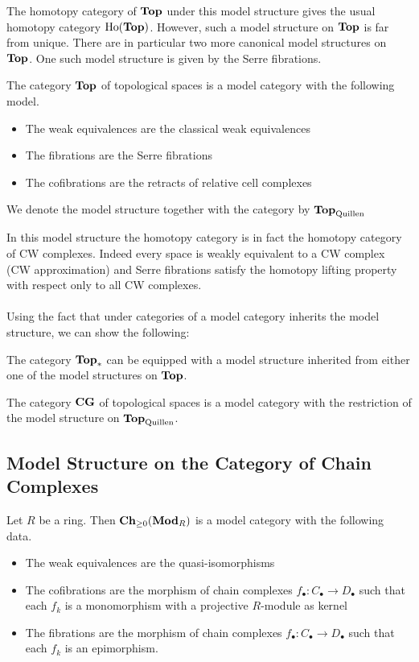 \documentclass[a4paper]{article}
\begin{document}
The homotopy category of $\bold{Top}$ under this model structure gives the usual homotopy category $\text{Ho}(\bold{Top})$. However, such a model structure on $\bold{Top}$ is far from unique. There are in particular two more canonical model structures on $\bold{Top}$. One such model structure is given by the Serre fibrations. 

\begin{thm}{}{} The category $\bold{Top}$ of topological spaces is a model category with the following model. 
\begin{itemize}
\item The weak equivalences are the classical weak equivalences
\item The fibrations are the Serre fibrations
\item The cofibrations are the retracts of relative cell complexes
\end{itemize}
We denote the model structure together with the category by $\bold{Top}_\text{Quillen}$
\end{thm}

In this model structure the homotopy category is in fact the homotopy category of CW complexes. Indeed every space is weakly equivalent to a CW complex (CW approximation) and Serre fibrations satisfy the homotopy lifting property with respect only to all CW complexes. \\~\\

Using the fact that under categories of a model category inherits the model structure, we can show the following: 

\begin{lmm}{}{} The category $\bold{Top}_\ast$ can be equipped with a model structure inherited from either one of the model structures on $\bold{Top}$. 
\end{lmm}

\begin{thm}{}{} The category $\bold{CG}$ of topological spaces is a model category with the restriction of the model structure on $\bold{Top}_\text{Quillen}$. 
\end{thm}


\subsection{Model Structure on the Category of Chain Complexes}
\begin{thm}{}{} Let $R$ be a ring. Then $\bold{Ch}_{\geq 0}(\bold{Mod}_R)$ is a model category with the following data. 
\begin{itemize}
\item The weak equivalences are the quasi-isomorphisms
\item The cofibrations are the morphism of chain complexes $f_\bullet:C_\bullet\to D_\bullet$ such that each $f_k$ is a monomorphism with a projective $R$-module as kernel
\item The fibrations are the morphism of chain complexes $f_\bullet:C_\bullet\to D_\bullet$ such that each $f_k$ is an epimorphism. 
\end{itemize}
\end{thm}
\end{document}
